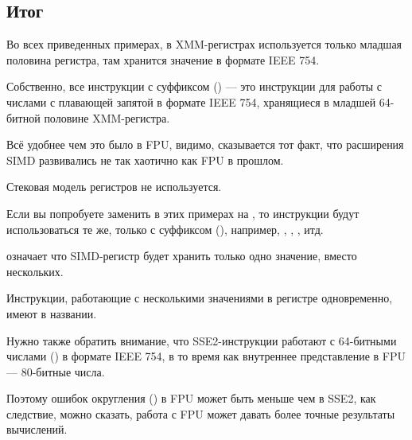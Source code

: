 \subsection{Итог}

Во всех приведенных примерах, в XMM-регистрах используется только младшая половина регистра, там
хранится значение в формате IEEE 754.

Собственно, все инструкции с суффиксом 
 () --- это инструкции для работы с числами с плавающей 
запятой в формате IEEE 754, 
хранящиеся в младшей 64-битной половине XMM-регистра.

Всё удобнее чем это было в FPU, видимо, сказывается тот факт, что расширения 
SIMD развивались не так хаотично как FPU в прошлом.

Стековая модель регистров не используется.

Если вы попробуете заменить в этих примерах \Tdouble на \Tfloat{}, то инструкции будут использоваться те же,
только с суффиксом
(), например, , , , итд.

 означает что SIMD-регистр будет хранить только одно значение, вместо нескольких.

Инструкции, работающие с несколькими значениями в регистре одновременно, имеют  в названии.

Нужно также обратить внимание, что SSE2-инструкции работают с 64-битными числами (\Tdouble) в формате IEEE 754,
в то время как внутреннее представление в FPU --- 80-битные числа.

Поэтому ошибок округления () в FPU может быть меньше чем в SSE2,
как следствие, можно сказать, работа с FPU может давать более точные результаты вычислений.

